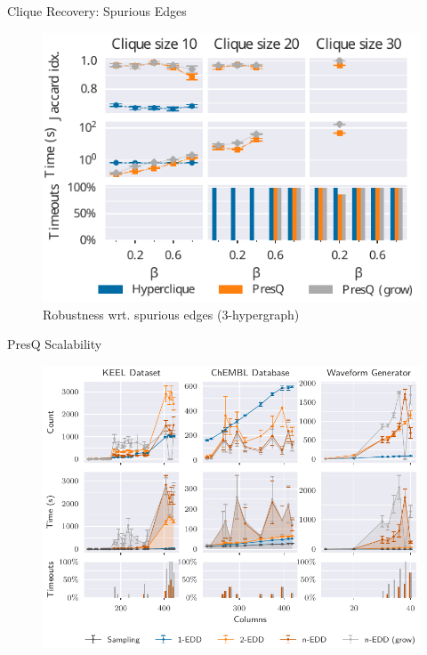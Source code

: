 \documentclass[10pt,compress]{beamer}
\begin{document}
\begin{frame}{Clique Recovery: Spurious Edges}
    \begin{figure}
        \centering
        \includegraphics{3hyper_beta}
        \caption{Robustness wrt. spurious edges (3-hypergraph)}
    \end{figure}
\end{frame}

\begin{frame}{PresQ Scalability}
\begin{figure}
    \centering
    \includegraphics[width=\textwidth]{scalability.pdf}
\end{figure}
\end{frame}
\end{document}
